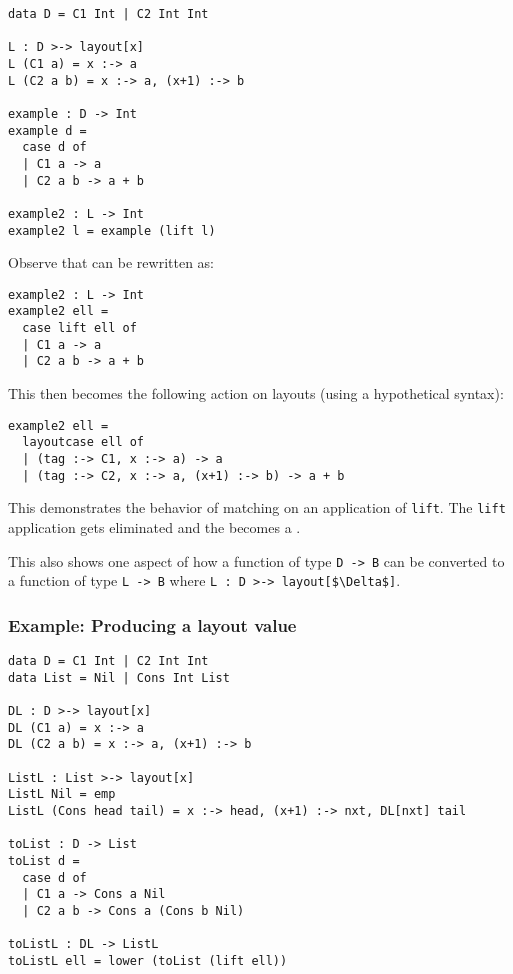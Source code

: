 \documentclass[10pt]{article}
\begin{document}
\begin{lstlisting}
data D = C1 Int | C2 Int Int

L : D >-> layout[x]
L (C1 a) = x :-> a
L (C2 a b) = x :-> a, (x+1) :-> b

example : D -> Int
example d =
  case d of
  | C1 a -> a
  | C2 a b -> a + b

example2 : L -> Int
example2 l = example (lift l)
\end{lstlisting}

\noindent
Observe that  can be rewritten as:

\begin{lstlisting}
example2 : L -> Int
example2 ell =
  case lift ell of
  | C1 a -> a
  | C2 a b -> a + b
\end{lstlisting}

\noindent
This then becomes the following action on layouts (using a hypothetical syntax):

\begin{lstlisting}
example2 ell =
  layoutcase ell of 
  | (tag :-> C1, x :-> a) -> a
  | (tag :-> C2, x :-> a, (x+1) :-> b) -> a + b
\end{lstlisting}

\noindent
This demonstrates the behavior of  matching on an application of \lstinline{lift}. The \lstinline{lift} application
gets eliminated and the  becomes a .

This also shows one aspect of how a function of type \lstinline{D -> B} can be converted to a function of type
\lstinline{L -> B} where \lstinline{L : D >-> layout[$\Delta$]}.

\subsubsection{Example: Producing a layout value}

\begin{lstlisting}
data D = C1 Int | C2 Int Int
data List = Nil | Cons Int List

DL : D >-> layout[x]
DL (C1 a) = x :-> a
DL (C2 a b) = x :-> a, (x+1) :-> b

ListL : List >-> layout[x]
ListL Nil = emp
ListL (Cons head tail) = x :-> head, (x+1) :-> nxt, DL[nxt] tail

toList : D -> List
toList d =
  case d of
  | C1 a -> Cons a Nil
  | C2 a b -> Cons a (Cons b Nil)

toListL : DL -> ListL
toListL ell = lower (toList (lift ell))
\end{lstlisting}
\end{document}

